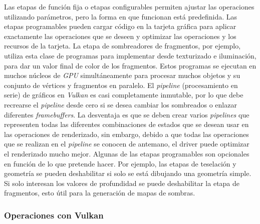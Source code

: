 \documentclass[a4paper]{book}
\begin{document}
Las etapas de función fija o etapas configurables permiten ajustar las operaciones utilizando parámetros, pero la forma en que funcionan está 
predefinida. Las etapas programables pueden cargar código en la tarjeta gráfica para aplicar exactamente las operaciones que se deseen y
optimizar las operaciones y los recursos de la tarjeta. La etapa de sombreadores de fragmentos, por ejemplo, utiliza esta
clase de programas para implementar desde texturizado e iluminación, para dar un valor final de color de los fragmentos.
Estos programas se ejecutan en muchos núcleos de \textit{GPU} simultáneamente para procesar muchos objetos y su conjunto de vértices
y fragmentos en paralelo. El \textit{pipeline} (procesamiento en serie) de gráficos en \textit{Vulkan} es casi completamente inmutable,
por lo que debe recrearse el \textit{pipeline} desde cero si se desea cambiar los sombreados o enlazar diferentes \textit{framebuffers}.
La desventaja es que se deben crear varios \textit{pipelines} que representen todas las diferentes combinaciones de estados que se desean
usar en las operaciones de renderizado, sin embargo, debido a que todas las operaciones que se realizan en el \textit{pipeline} se conocen
de antemano, el driver puede optimizar el renderizado mucho mejor. Algunas de las etapas programables son opcionales en función de lo que
pretende hacer. Por ejemplo, las etapas de teselación y geometría se pueden deshabilitar si solo se está dibujando una geometría simple.
Si solo interesan los valores de profundidad se puede deshabilitar la etapa de fragmentos, esto útil para la generación
de mapas de sombras. \cite{book:_vulkan}

\subsubsection{Operaciones con Vulkan}
\label{subsubsec:OpVulkan}
\end{document}
